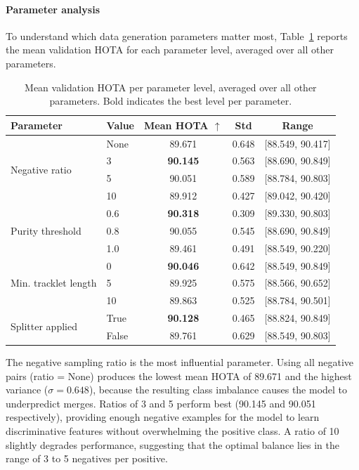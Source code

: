 \paragraph{Parameter analysis}
To understand which data generation parameters matter most, Table~\ref{tab:xgboost_param_trends} reports the mean validation HOTA for each parameter level, averaged over all other parameters.

\begin{table}[H]
\centering
\begin{tabular}{llccc}
\toprule
\textbf{Parameter} & \textbf{Value} & \textbf{Mean HOTA $\uparrow$} & \textbf{Std} & \textbf{Range} \\
\midrule
\multirow{4}{*}{Negative ratio}
 & None       & 89.671 & 0.648 & [88.549, 90.417] \\
 & 3          & \textbf{90.145} & 0.563 & [88.690, 90.849] \\
 & 5          & 90.051 & 0.589 & [88.784, 90.803] \\
 & 10         & 89.912 & 0.427 & [89.042, 90.420] \\
\midrule
\multirow{3}{*}{Purity threshold}
 & 0.6        & \textbf{90.318} & 0.309 & [89.330, 90.803] \\
 & 0.8        & 90.055 & 0.545 & [88.690, 90.849] \\
 & 1.0        & 89.461 & 0.491 & [88.549, 90.220] \\
\midrule
\multirow{3}{*}{Min. tracklet length}
 & 0          & \textbf{90.046} & 0.642 & [88.549, 90.849] \\
 & 5          & 89.925 & 0.575 & [88.566, 90.652] \\
 & 10         & 89.863 & 0.525 & [88.784, 90.501] \\
\midrule
\multirow{2}{*}{Splitter applied}
 & True       & \textbf{90.128} & 0.465 & [88.824, 90.849] \\
 & False      & 89.761 & 0.629 & [88.549, 90.803] \\
\bottomrule
\end{tabular}
\caption{Mean validation HOTA per parameter level, averaged over all other parameters. Bold indicates the best level per parameter.}
\label{tab:xgboost_param_trends}
\end{table}

The negative sampling ratio is the most influential parameter. Using all negative pairs (ratio = None) produces the lowest mean HOTA of 89.671 and the highest variance ($\sigma = 0.648$), because the resulting class imbalance causes the model to underpredict merges. Ratios of 3 and 5 perform best (90.145 and 90.051 respectively), providing enough negative examples for the model to learn discriminative features without overwhelming the positive class. A ratio of 10 slightly degrades performance, suggesting that the optimal balance lies in the range of 3 to 5 negatives per positive.

